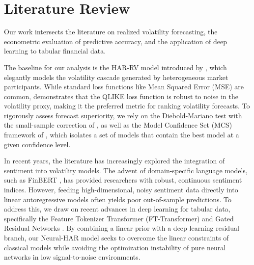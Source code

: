 \section{Literature Review}
\label{sec:lit}
Our work intersects the literature on realized volatility forecasting, the econometric evaluation of predictive accuracy, and the application of deep learning to tabular financial data. 

The baseline for our analysis is the HAR-RV model introduced by \cite{corsi2009simple}, which elegantly models the volatility cascade generated by heterogeneous market participants. While standard loss functions like Mean Squared Error (MSE) are common, \cite{patton2011volatility} demonstrates that the QLIKE loss function is robust to noise in the volatility proxy, making it the preferred metric for ranking volatility forecasts. To rigorously assess forecast superiority, we rely on the Diebold-Mariano test \cite{diebold1995comparing} with the small-sample correction of \cite{harvey1997testing}, as well as the Model Confidence Set (MCS) framework of \cite{hansen2011model}, which isolates a set of models that contain the best model at a given confidence level.

In recent years, the literature has increasingly explored the integration of sentiment into volatility models. The advent of domain-specific language models, such as FinBERT \cite{araci2019finbert, yang2020finbert}, has provided researchers with robust, continuous sentiment indices. However, feeding high-dimensional, noisy sentiment data directly into linear autoregressive models often yields poor out-of-sample predictions. To address this, we draw on recent advances in deep learning for tabular data, specifically the Feature Tokenizer Transformer (FT-Transformer) and Gated Residual Networks \cite{gorishniy2021revisiting}. By combining a linear prior with a deep learning residual branch, our Neural-HAR model seeks to overcome the linear constraints of classical models while avoiding the optimization instability of pure neural networks in low signal-to-noise environments.
